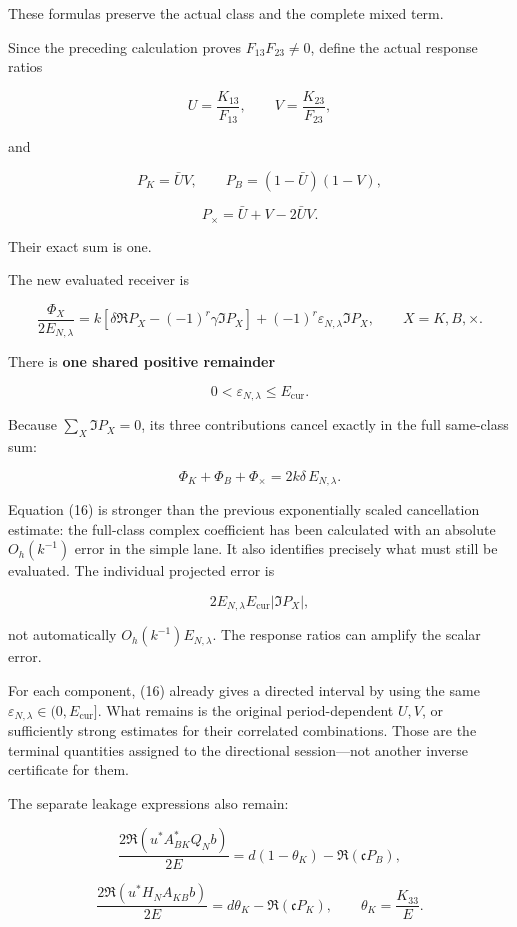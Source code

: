 These formulas preserve the actual class and the complete mixed term.

Since the preceding calculation proves \(F_{13}F_{23}\ne0\), define the actual response ratios

\[
U=\frac{K_{13}}{F_{13}},
\qquad
V=\frac{K_{23}}{F_{23}},
\]

and

\[
P_K=\bar U V,\qquad
P_B=(1-\bar U)(1-V),
\]

\[
P_\times=\bar U+V-2\bar U V.
\]

Their exact sum is one.

The new evaluated receiver is

\[
\boxed{
\frac{\Phi_X}{2E_{N,\lambda}}
=
k\left[
\delta\Re P_X-(-1)^r\gamma\Im P_X
\right]
+
(-1)^r\varepsilon_{N,\lambda}\Im P_X,
\qquad X=K,B,\times.
}
\tag{16}
\]

There is \textbf{one shared positive remainder}

\[
0<\varepsilon_{N,\lambda}\le E_{\mathrm{cur}}.
\]

Because \(\sum_X\Im P_X=0\), its three contributions cancel exactly in the full same-class sum:

\[
\Phi_K+\Phi_B+\Phi_\times
=
2k\delta\,E_{N,\lambda}.
\]

Equation (16) is stronger than the previous exponentially scaled cancellation estimate: the full-class complex coefficient has been calculated with an absolute \(O_h(k^{-1})\) error in the simple lane. It also identifies precisely what must still be evaluated. The individual projected error is

\[
2E_{N,\lambda}E_{\mathrm{cur}}|\Im P_X|,
\]

not automatically \(O_h(k^{-1})E_{N,\lambda}\). The response ratios can amplify the scalar error.

For each component, (16) already gives a directed interval by using the same \(\varepsilon_{N,\lambda}\in(0,E_{\mathrm{cur}}]\). What remains is the original period-dependent \(U,V\), or sufficiently strong estimates for their correlated combinations. Those are the terminal quantities assigned to the directional session---not another inverse certificate for them.

The separate leakage expressions also remain:

\[
\frac{2\Re(u^*A_{BK}^*Q_Nb)}{2E}
=
d(1-\theta_K)-\Re(\mathfrak c P_B),
\]

\[
\frac{2\Re(u^*H_NA_{KB}b)}{2E}
=
d\theta_K-\Re(\mathfrak c P_K),
\qquad
\theta_K=\frac{K_{33}}E.
\]

